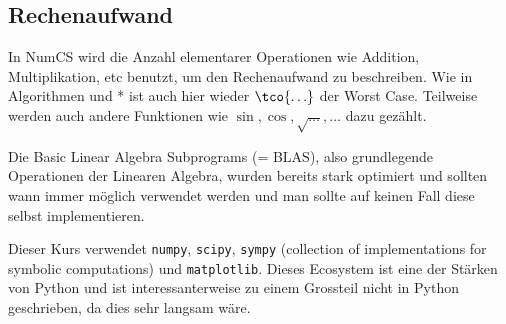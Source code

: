 
\newsection
\subsection{Rechenaufwand}
In NumCS wird die Anzahl elementarer Operationen wie Addition, Multiplikation, etc benutzt, um den Rechenaufwand zu beschreiben. 
Wie in Algorithmen und * ist auch hier wieder $\tco{\ldots}$ der Worst Case.
Teilweise werden auch andere Funktionen wie $\sin, \cos, \sqrt{\ldots}, \ldots$ dazu gezählt.

Die Basic Linear Algebra Subprograms (= BLAS), also grundlegende Operationen der Linearen Algebra, wurden bereits stark optimiert und sollten wann immer möglich verwendet werden und man sollte auf keinen Fall diese selbst implementieren.

Dieser Kurs verwendet \texttt{numpy}, \texttt{scipy}, \texttt{sympy} (collection of implementations for symbolic computations) und \texttt{matplotlib}.
Dieses Ecosystem ist eine der Stärken von Python und ist interessanterweise zu einem Grossteil nicht in Python geschrieben, da dies sehr langsam wäre.
